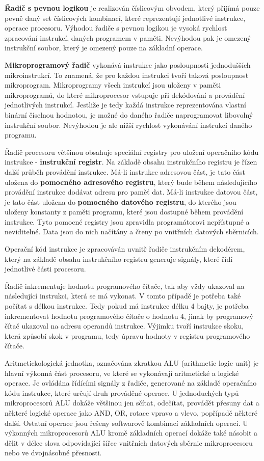 {\bf Řadič s pevnou logikou} je realizován číslicovým obvodem, který přijímá pouze pevně daný set číslicových kombinací, které reprezentují jednotlivé instrukce, operace procesoru. Výhodou řadiče s pevnou logikou je vysoká rychlost zpracování instrukcí, daných programem v paměti. Nevýhodou pak je omezený instrukční soubor, který je omezený pouze na základní operace.

{\bf Mikroprogramový řadič} vykonává instrukce jako posloupnosti jednodušších mikroinstrukcí. To znamená, že pro každou instrukci tvoří taková posloupnost mikroprogram. Mikroprogramy všech instrukcí jsou uloženy v paměti mikroprogramů, do které mikroprocesor vstupuje při dekódování a provádění jednotlivých instrukcí. Jestliže je tedy každá instrukce reprezentována vlastní binární číselnou hodnotou, je možné do daného řadiče naprogramovat libovolný instrukční soubor. Nevýhodou je ale nižší rychlost vykonávání instrukcí daného programu.

Řadič procesoru většinou obsahuje speciální registry pro uložení operačního kódu instrukce - {\bf instrukční registr}. Na základě obsahu instrukčního registru je řízen další průběh provádění instrukce. Má-li instrukce adresovou část, je tato část uložena do {\bf pomocného adresového registru}, který bude během následujícího provádění instrukce dodávat adresu pro paměť dat. Má-li instrukce datovou část, je tato část uložena do {\bf pomocného datového registru}, do kterého jsou uloženy konstanty z paměti programu, které jsou dostupné během provádění instrukce. Tyto pomocné registry jsou zpravidla programátorovi nepřístupné a neviditelné. Data jsou do nich načítány a čteny po vnitřních datových sběrnicích.

Operační kód instrukce je zpracováván uvnitř řadiče instrukčním dekodérem, který na základě obsahu instrukčního registru generuje signály, které řídí jednotlivé části procesoru.

Řadič inkrementuje hodnotu programového čítače, tak aby vždy ukazoval na následující instrukci, která se má vykonat. V tomto případě je potřeba také počítat s délkou instrukce. Tedy pokud má instrukce délku 4 bajty, je potřeba inkrementovat hodnotu programového čítače o hodnotu 4, jinak by programový čítač ukazoval na adresu operandů instrukce. Výjimku tvoří instrukce skoku, která způsobí skok v programu, tedy úpravu hodnoty v registru programového čítače. 


Aritmetickologická jednotka, označována zkratkou ALU (arithmetic logic unit) je hlavní výkonná část procesoru, ve které se vykonávají aritmetické a logické operace. Je ovládána řídícími signály z řadiče, generované na základě operačního kódu instrukce, které určují druh prováděné operace. U jednoduchých typů mikroprocesorů ALU dokáže většinou jen sčítat, odečítat, provádět přesuny dat a některé logické operace jako AND, OR, rotace vpravo a vlevo, popřípadě některé další. Ostatní operace jsou řešeny softwarově kombinací základních operací. U výkonných mikroprocesorů ALU kromě základních operací dokáže také násobit a dělit v délce slova odpovídající šířce vnitřních datových sběrnic mikroprocesoru nebo ve dvojnásobné přesnosti.

